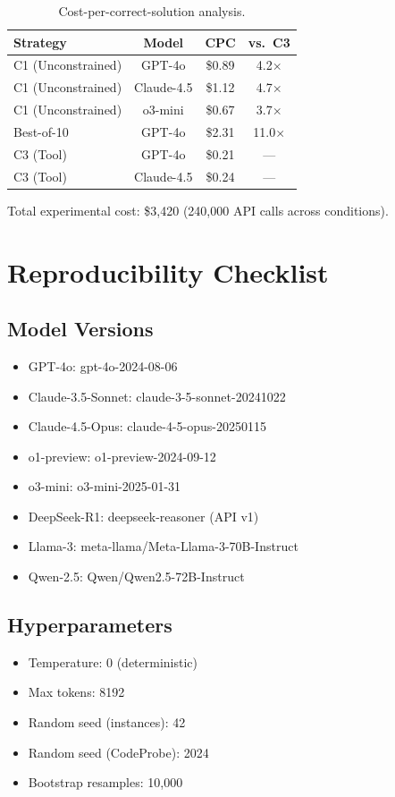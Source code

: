 \documentclass{article}
\theoremstyle{plain}
\theoremstyle{definition}
\theoremstyle{remark}
\begin{document}
\begin{table}[h]
\centering
\caption{Cost-per-correct-solution analysis.}
\label{tab:cost}
\small
\begin{tabular}{@{}lccc@{}}
\toprule
\textbf{Strategy} & \textbf{Model} & \textbf{CPC} & \textbf{vs.\ C3} \\
\midrule
C1 (Unconstrained) & GPT-4o & \$0.89 & 4.2$\times$ \\
C1 (Unconstrained) & Claude-4.5 & \$1.12 & 4.7$\times$ \\
C1 (Unconstrained) & o3-mini & \$0.67 & 3.7$\times$ \\
Best-of-10 & GPT-4o & \$2.31 & 11.0$\times$ \\
C3 (Tool) & GPT-4o & \$0.21 & --- \\
C3 (Tool) & Claude-4.5 & \$0.24 & --- \\
\bottomrule
\end{tabular}
\end{table}

Total experimental cost: \$3,420 (240,000 API calls across conditions).


\section{Reproducibility Checklist}
\label{app:reproduce}

\subsection{Model Versions}
\begin{itemize}
\item GPT-4o: gpt-4o-2024-08-06
\item Claude-3.5-Sonnet: claude-3-5-sonnet-20241022
\item Claude-4.5-Opus: claude-4-5-opus-20250115
\item o1-preview: o1-preview-2024-09-12
\item o3-mini: o3-mini-2025-01-31
\item DeepSeek-R1: deepseek-reasoner (API v1)
\item Llama-3: meta-llama/Meta-Llama-3-70B-Instruct
\item Qwen-2.5: Qwen/Qwen2.5-72B-Instruct
\end{itemize}

\subsection{Hyperparameters}
\begin{itemize}
\item Temperature: 0 (deterministic)
\item Max tokens: 8192
\item Random seed (instances): 42
\item Random seed (CodeProbe): 2024
\item Bootstrap resamples: 10,000
\end{itemize}
\end{document}
